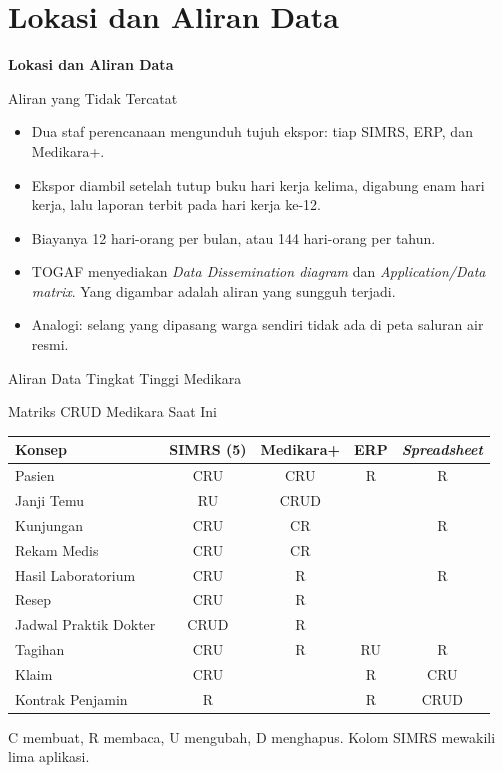 \documentclass[aspectratio=169, table, 12pt]{beamer}
\begin{document}
\section{Lokasi dan Aliran Data}

\begin{frame}{\hfill}
  \centering
  \Huge{\textbf{Lokasi dan Aliran Data}}
\end{frame}

\begin{frame}{{\Large Aliran yang Tidak Tercatat}}
  \vspace{6pt}
  \small
  \begin{itemize}
    \item Dua staf perencanaan mengunduh tujuh ekspor: tiap SIMRS, ERP, dan Medikara+.
    \item Ekspor diambil setelah tutup buku hari kerja kelima, digabung enam hari kerja, lalu laporan
          terbit pada hari kerja ke-12.
    \item Biayanya 12 hari-orang per bulan, atau 144 hari-orang per tahun.
    \item TOGAF menyediakan \textit{Data Dissemination diagram} dan \textit{Application/Data matrix}. Yang
          digambar adalah aliran yang sungguh terjadi.
    \item Analogi: selang yang dipasang warga sendiri tidak ada di peta saluran air resmi.
  \end{itemize}
\end{frame}

\begin{frame}{{\Large Aliran Data Tingkat Tinggi Medikara}}
  \centering
\end{frame}

\begin{frame}{{\Large Matriks CRUD Medikara Saat Ini}}
  \footnotesize
  \begin{tabularx}{\textwidth}{Xcccc}
    \hline
    \textbf{Konsep} & \textbf{SIMRS (5)} & \textbf{Medikara+} & \textbf{ERP} &
      \textbf{\textit{Spreadsheet}} \\
    \hline
    Pasien & CRU & CRU & R & R \\
    \hline
    Janji Temu & RU & CRUD & & \\
    \hline
    Kunjungan & CRU & CR & & R \\
    \hline
    Rekam Medis & CRU & CR & & \\
    \hline
    Hasil Laboratorium & CRU & R & & R \\
    \hline
    Resep & CRU & R & & \\
    \hline
    Jadwal Praktik Dokter & CRUD & R & & \\
    \hline
    Tagihan & CRU & R & RU & R \\
    \hline
    Klaim & CRU & & R & CRU \\
    \hline
    Kontrak Penjamin & R & & R & CRUD \\
    \hline
  \end{tabularx}

  \vspace{6pt}
  \small C membuat, R membaca, U mengubah, D menghapus. Kolom SIMRS mewakili lima aplikasi.
\end{frame}
\end{document}
